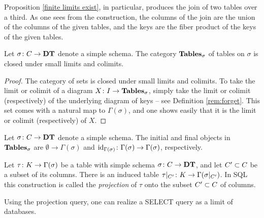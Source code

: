 \documentclass{amsart}
\def\DT{{\bf DT}}
\def\Tables{{\bf Tables}}
\begin{document}
Proposition \ref{finite limits exist}, in particular, produces the join of two tables over a third.  As one sees from the construction, the columns of the join are the union of the columns of the given tables, and the keys are the fiber product of the keys of the given tables.

\begin{lemma}

Let $\sigma\taking C\to\DT$ denote a simple schema.  The category $\Tables_\sigma$ of tables on $\sigma$ is closed under small limits and colimits.

\end{lemma}

\begin{proof}

The category of sets is closed under small limits and colimits.  To take the limit or colimit of a diagram $X\taking I\to\Tables_\sigma$, simply take the limit or colimit (respectively) of the underlying diagram of keys -- see Definition \ref{rem:forget}.  This set comes with a natural map to $\Gamma(\sigma)$, and one shows easily that it is the limit or colimit (respectively) of $X$.

\end{proof}

\begin{example}\label{ex:initial and final over sigma}

Let $\sigma\taking C\to\DT$ denote a simple schema.  The initial and final objects in $\Tables_\sigma$ are $\emptyset\to\Gamma(\sigma)$ and $\id_{\Gamma(\sigma)}\taking\Gamma(\sigma)\to\Gamma(\sigma)$, respectively.

\end{example}

\begin{construction}

Let $\tau\taking K\to\Gamma(\sigma)$ be a table with simple schema $\sigma\taking C\to\DT$, and let $C'\ss C$ be a subset of its columns.  There is an induced table $\tau|_{C'}\taking K\to\Gamma(\sigma|_{C'})$.  In SQL this construction is called the {\em projection} of $\tau$ onto the subset $C'\ss C$ of columns.

\end{construction}

Using the projection query, one can realize a SELECT query as a limit of databases.  
\end{document}
